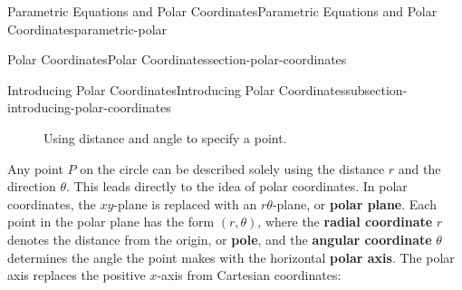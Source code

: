 \documentclass[oneside,10pt,]{book}
\newcommand{\terminology}[1]{\textbf{#1}}
\numberwithin{equation}{section}
\begin{document}
\begin{chapterptx}{Parametric Equations and Polar Coordinates}{}{Parametric Equations and Polar Coordinates}{}{}{parametric-polar}
\begin{sectionptx}{Polar Coordinates}{}{Polar Coordinates}{}{}{section-polar-coordinates}
\begin{subsectionptx}{Introducing Polar Coordinates}{}{Introducing Polar Coordinates}{}{}{subsection-introducing-polar-coordinates}
\begin{figure}
{
}
\caption{Using distance and angle to specify a point.\label{figure-polar-coords}}
\end{figure}
\hypertarget{p-1016}{}%
Any point \(P\) on the circle can be described solely using the distance \(r\) and the direction \(\theta\). This leads directly to the idea of polar coordinates. In polar coordinates, the \(xy\)-plane is replaced with an \(r\theta\)-plane, or \terminology{polar plane}. Each point in the polar plane has the form \((r,\theta)\), where the \terminology{radial coordinate} \(r\) denotes the distance from the origin, or \terminology{pole}, and the \terminology{angular coordinate} \(\theta\) determines the angle the point makes with the horizontal \terminology{polar axis}. The polar axis replaces the positive \(x\)-axis from Cartesian coordinates:%
\begin{figure}
\centering
{
}
\end{figure}
\end{subsectionptx}
\end{sectionptx}
\end{chapterptx}
\end{document}
